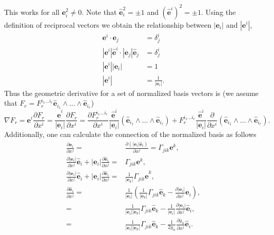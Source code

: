 \documentclass[12pt]{report}
\newcommand{\bm}[1]{\boldsymbol{#1}}
\newcommand{\bfrac}[2]{\displaystyle\frac{#1}{#2}}
\newcommand{\lp}{\left (}
\newcommand{\rp}{\right )}
\newcommand{\abs}[1]{\left |{#1}\right |}
\newcommand{\pdiff}[2]{\bfrac{\partial {#1}}{\partial {#2}}}
\newcommand{\W}{\wedge}
\newcommand{\paren}[1]{\lp {#1} \rp}
\newcommand{\be}{\begin{equation}}
\newcommand{\ee}{\end{equation}}
\newcommand{\eb}{\bm{e}}
\newcommand{\ehb}{\bm{\hat{e}}}
\begin{document}
This works for all $\bm{e}_{i}^{2} \neq 0$.  Note that  $\bm{\hat{e}}_{i}^{2} = \pm 1$ and $\paren{\bm{\hat{e}}^{i}}^{2} = \pm 1$.  
Using the definition of reciprocal vectors we obtain the relationship between $\abs{\bm{e}_{i}}$ and $\abs{\bm{e}^{i}}$,
\begin{align*}
	\bm{e}^{i}\cdot \bm{e}_{j} &= \delta^{i}_{j} \nonumber \\
	\abs{\bm{e}^{i}}\bm{\hat{e}}^{i}\cdot \abs{\bm{e}_{j}}\bm{\hat{e}}_{j} &= \delta^{i}_{j} \nonumber \\
	\abs{\bm{e}^{i}}\abs{\bm{e}_{i}} &= 1 \nonumber \\
	\abs{\bm{e}^{i}} &= \bfrac{1}{\abs{\bm{e}_{i}}}.
\end{align*} 
Thus the geometric derivative for a set of normalized basis vectors is (we assume that 
$F_{r} = F_{r}^{i_{1}\dots i_{r}} \bm{\hat{e}}_{i_{1}}\W\dots\W\bm{\hat{e}}_{i_{r}}$)
\be
	\nabla F_{r} = \eb^{i}\pdiff{F_{r}}{x^{i}} = \bfrac{\ehb^{i}}{\abs{\eb_{i}}}\pdiff{F_{r}}{x^{i}}
	             =\pdiff{F_{r}^{i_{1}\dots i_{r}}}{x^{i}}\bfrac{\bm{\hat{e}}^{i}}{\abs{\bm{e}_{i}}}
	               \paren{\bm{\hat{e}}_{i_{1}}\W\dots\W\bm{\hat{e}}_{i_{r}}}
	                +F_{r}^{i_{1}\dots i_{r}}\bfrac{\bm{\hat{e}}^{i}}{\abs{\bm{e}_{i}}}\pdiff{}{x^{i}}
	                \paren{\bm{\hat{e}}_{i_{1}}\W\dots\W\bm{\hat{e}}_{i_{r}}}.
\ee
Additionally, one can calculate the connection of the normalized basis as follows
\begin{align}
	\pdiff{\bm{e}_{i}}{x^{j}} =& \pdiff{\paren{\abs{\bm{e}_{i}}\bm{\hat{e}}_{i}}}{x^{j}} = \Gamma_{jik}\bm{e}^{k}, \nonumber \\
	\pdiff{\abs{\bm{e}_{i}}}{x^{j}}\bm{\hat{e}}_{i}
							          +\abs{\bm{e}_{i}}\pdiff{\bm{\hat{e}}_{i}}{x^{j}} =&\Gamma_{jik}\bm{e}^{k}, \nonumber \\
	\pdiff{\abs{\bm{e}_{i}}}{x^{j}}\bm{\hat{e}}_{i}
							          +\abs{\bm{e}_{i}}\pdiff{\bm{\hat{e}}_{i}}{x^{j}} =& \bfrac{1}{\abs{\bm{e}_{k}}}\Gamma_{jik}\bm{\hat{e}}^{k}, \nonumber \\
	\pdiff{\bm{\hat{e}}_{i}}{x^{j}} =& \bfrac{1}{\abs{\bm{e}_{i}}}\paren{\bfrac{1}{\abs{\bm{e}_{k}}}\Gamma_{jik}\bm{\hat{e}}_{k}
	                                   -\pdiff{\abs{\bm{e}_{i}}}{x^{j}}\bm{\hat{e}}_{i}}, \nonumber \\
	                                =& \bfrac{1}{\abs{\bm{e}_{i}}\abs{\bm{e}_{k}}}\Gamma_{jik}\bm{\hat{e}}_{k}
	                                   -\bfrac{1}{\abs{\bm{e}_{i}}}\pdiff{\abs{\bm{e}_{i}}}{x^{j}}\bm{\hat{e}}_{i},  \nonumber \\
	                                =& \bfrac{1}{\abs{\bm{e}_{i}}\abs{\bm{e}_{k}}}\Gamma_{jik}\bm{\hat{e}}_{k}
	                                   -\bfrac{1}{2g_{ii}}\pdiff{g_{ii}}{x^{j}}\bm{\hat{e}}_{i}.
\end{align}
\end{document}
